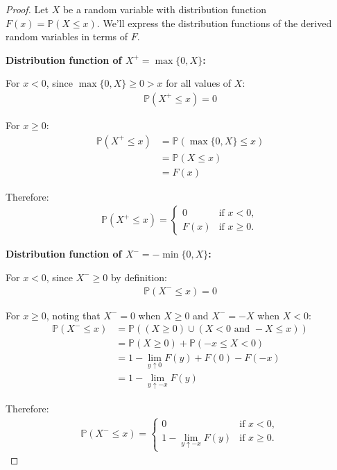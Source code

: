 \documentclass[letterpaper, 11pt]{article}
\newcommand{\1}{\mathds{1}}	%
\theoremstyle{definition}
\begin{document}
\begin{proof}
    Let $X$ be a random variable with distribution function $F(x) = \mathbb{P}(X \leq x)$. We'll express the distribution functions of the derived random variables in terms of $F$.

\textbf{Distribution function of $X^+ = \max\{0, X\}$:}

For $x < 0$, since $\max\{0, X\} \geq 0 > x$ for all values of $X$:
\begin{align*}
\mathbb{P}(X^+ \leq x) = 0
\end{align*}

For $x \geq 0$:
\begin{align*}
\mathbb{P}(X^+ \leq x) &= \mathbb{P}(\max\{0, X\} \leq x)\\
&= \mathbb{P}(X \leq x)\\
&= F(x)
\end{align*}

Therefore:
\begin{align*}
\mathbb{P}(X^+ \leq x) = 
\begin{cases}
0 & \text{if } x < 0,\\
F(x) & \text{if } x \geq 0.
\end{cases}
\end{align*}

\textbf{Distribution function of $X^- = -\min\{0, X\}$:}

For $x < 0$, since $X^- \geq 0$ by definition:
\begin{align*}
\mathbb{P}(X^- \leq x) = 0
\end{align*}

For $x \geq 0$, noting that $X^- = 0$ when $X \geq 0$ and $X^- = -X$ when $X < 0$:
\begin{align*}
\mathbb{P}(X^- \leq x) &= \mathbb{P}((X \geq 0) \cup (X < 0 \text{ and } -X \leq x))\\
&= \mathbb{P}(X \geq 0) + \mathbb{P}(-x \leq X < 0)\\
&= 1 - \lim_{y \uparrow 0} F(y) + F(0) - F(-x)\\
&= 1 - \lim_{y \uparrow -x} F(y)
\end{align*}

Therefore:
\begin{align*}
\mathbb{P}(X^- \leq x) = 
\begin{cases}
0 & \text{if } x < 0,\\
1 - \lim_{y \uparrow -x} F(y) & \text{if } x \geq 0.
\end{cases}
\end{align*}


\end{proof}
\end{document}
